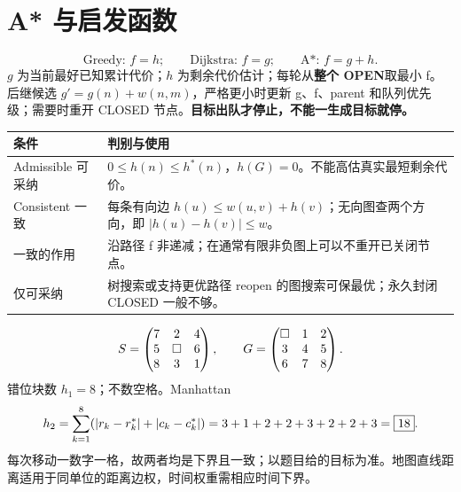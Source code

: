 \section{A* 与启发函数}\label{sec:astar}
\[
\text{Greedy: }f=h;\qquad\text{Dijkstra: }f=g;\qquad\text{A*: }f=g+h.
\]
$g$ 为当前最好已知累计代价；$h$ 为剩余代价估计；每轮从\textbf{整个 OPEN}取最小 f。后继候选 $g'=g(n)+w(n,m)$，严格更小时更新 g、f、parent 和队列优先级；需要时重开 CLOSED 节点。\textbf{目标出队才停止，不能一生成目标就停。}

\par\noindent\begin{tabularx}{\textwidth}{lY}
\toprule 条件 & 判别与使用\\\midrule
Admissible 可采纳 & $0\le h(n)\le h^*(n)$，$h(G)=0$。不能高估真实最短剩余代价。\\
Consistent 一致 & 每条有向边 $h(u)\le w(u,v)+h(v)$；无向图查两个方向，即 $|h(u)-h(v)|\le w$。\\
一致的作用 & 沿路径 f 非递减；在通常有限非负图上可以不重开已关闭节点。\\
仅可采纳 & 树搜索或支持更优路径 reopen 的图搜索可保最优；永久封闭 CLOSED 一般不够。\\\bottomrule
\end{tabularx}\par

\[
S=\begin{pmatrix}7&2&4\\5&\square&6\\8&3&1\end{pmatrix},\qquad
G=\begin{pmatrix}\square&1&2\\3&4&5\\6&7&8\end{pmatrix}.
\]
错位块数 $h_1=8$；不数空格。Manhattan
\[
h_2=\sum_{k=1}^8(|r_k-r_k^*|+|c_k-c_k^*|)
=3+1+2+2+3+2+2+3=\boxed{18}.
\]
每次移动一数字一格，故两者均是下界且一致；以题目给的目标为准。地图直线距离适用于同单位的距离边权，时间权重需相应时间下界。

